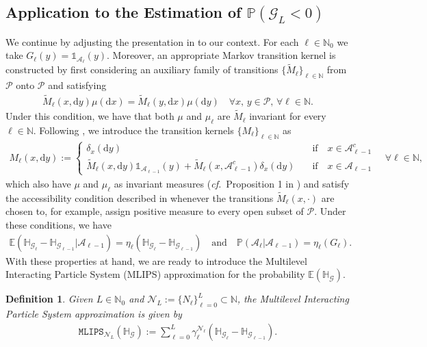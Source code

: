 \documentclass{article}
\newtheorem{definition}[theorem]{Definition}
\newcommand{\cA}{\mathcal{A}}
\newcommand{\cG}{\mathcal{G}}
\newcommand{\cP}{\mathcal{P}}
\newcommand{\cN}{\mathcal{N}}
\newcommand{\IE}{\mathbb{E}}
\newcommand{\IH}{\mathbb{H}}
\newcommand{\IN}{\mathbb{N}}
\newcommand{\IP}{\mathbb{P}}
\newcommand{\bOne}{\mathds{1}}
\renewcommand{\d}{{\text{d}}}
\newcommand{\dx}{{\d x}}
\newcommand{\dy}{{\d y}}
\newcommand{\mlmk}[2]{\mathtt{MLIPS}_{#1}{\left(#2\right)}}
\theoremstyle{definition}
\begin{document}
\subsection{Application to the Estimation of $\IP(\cG_L<0)$}
\label{ssec:mlmcProb}
We continue by adjusting the presentation in  to our context. For each $\ell\in\IN_0$ we take
$G_\ell(y)=\bOne_{\cA_{\ell}}(y)$. Moreover, an appropriate Markov transition kernel is constructed by first
considering an auxiliary family of transitions $\{\widetilde{M}_\ell\}_{\ell\in\IN}$ from $\cP$ onto $\cP$ and satisfying
\begin{align*}
  \widetilde{M}_{\ell}(x, \dy)\mu(\dx) = \widetilde{M}_{\ell}(y, \dx)\mu(\dy)\quad\forall x,\, y\in\cP,\, \forall\ell\in\IN.
\end{align*}
Under this condition, we have that both $\mu$ and $\mu_\ell$ are $\widetilde{M}_{\ell}$ invariant for every $\ell\in\IN$.
Following \cite{cerouSequentialMonteCarlo2012}, we introduce the transition kernels $\{M_{\ell}\}_{\ell\in\IN}$ as
\begin{align}
  \label{eq:kerDef}
  {M}_{\ell}(x, \dy) := \begin{cases}
    \delta_x(\dy)\quad &\text{if}\quad x\in \cA_{\ell-1}^c \\
    \widetilde{M}_\ell(x,\dy)\bOne_{\cA_{\ell-1}}(y) + \widetilde{M}_\ell(x,\cA_{\ell-1}^c)\delta_x(\dy)\quad &\text{if}\quad x\in \cA_{\ell-1}
  \end{cases}\quad\forall\ell\in\IN,
\end{align}
which also have $\mu$ and $\mu_\ell$ as invariant measures (\emph{cf.}~Proposition 1 in \cite{cerouSequentialMonteCarlo2012}) and satisfy
  the accessibility condition described in  whenever the transitions $\widetilde{M}_\ell(x,\cdot)$ are chosen to, for example,
  assign positive measure to every open subset of $\cP$.
Under these conditions, we have
\begin{align*}
  \IE(\IH_{\cG_\ell}-\IH_{\cG_{\ell-1}}\vert\cA_{\ell-1})=\eta_\ell(\IH_{\cG_\ell}-\IH_{\cG_{\ell-1}})\quad\text{and}\quad
  \IP(\cA_\ell\vert \cA_{\ell-1})=\eta_\ell(G_{\ell}).
\end{align*}
With these properties at hand, we are ready to introduce the Multilevel Interacting Particle System (MLIPS) approximation for the probability
$\IE(\IH_{\cG})$.
\begin{definition}
  \label{def:mlmk}
  Given $L\in\IN_0$ and $\cN_L:=\{N_\ell\}_{\ell=0}^L \subset \IN$, the \emph{Multilevel Interacting Particle System} approximation  is given by
  \begin{align*}
    \mlmk{\cN_L}{\IH_\cG}:=\sum\limits_{\ell=0}^{L}\gamma_\ell^{\cN_\ell}(\IH_{\cG_\ell}-\IH_{\cG_{\ell-1}}).
  \end{align*}
\end{definition}
\end{document}

